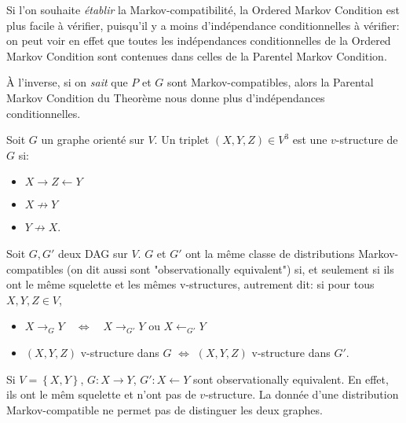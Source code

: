 \begin{remark}
Si l'on souhaite \emph{établir} la Markov-compatibilité, la
  Ordered Markov Condition est plus facile à vérifier,
  puisqu'il y a moins d'indépendance conditionnelles à
  vérifier: on peut voir en effet que toutes les indépendances conditionnelles de la Ordered Markov Condition sont contenues dans celles de la Parentel Markov Condition.

À l'inverse, si on \emph{sait} que $P$ et $G$ sont
  Markov-compatibles, alors la Parental Markov Condition du Theorème
  nous donne plus d'indépendances conditionnelles.
\end{remark}

\begin{definition}[$v$-structure]
Soit $G$ un graphe orienté sur $V$. Un triplet $(X,Y,Z)\in V^3$ est une $v$-structure de $G$ si:
\begin{itemize}
\item $X\to Z\leftarrow Y$
\item $X\not \to Y$
\item $Y\not \to X$.
\end{itemize}
\end{definition}
\begin{theorem}
\label{thm:1}
Soit $G,G'$ deux DAG sur $V$.
$G$ et $G'$ ont la même classe de distributions Markov-compatibles
(on dit aussi sont "observationally equivalent") si, et seulement si
ils ont le même squelette et les mêmes v-structures, autrement dit:
si pour tous $X,Y,Z\in V$,
\begin{itemize}
\item $X\to_G Y\quad \Longleftrightarrow \quad X\to_{G'} Y$ ou $X\leftarrow_{G'} Y$
\item $(X,Y,Z)$ v-structure dans $G$ $\Longleftrightarrow$ $(X,Y,Z)$
  v-structure dans $G'$.
\end{itemize}
\end{theorem}

\begin{example}
  Si $V=\left\{ X,Y \right\}$, $G:X\to Y$, $G':X\leftarrow Y$ sont
  observationally equivalent. En effet, ils ont le mêm squelette et
  n'ont pas de $v$-structure. La donnée d'une distribution Markov-compatible ne permet pas de distinguer les deux graphes.
\end{example}


